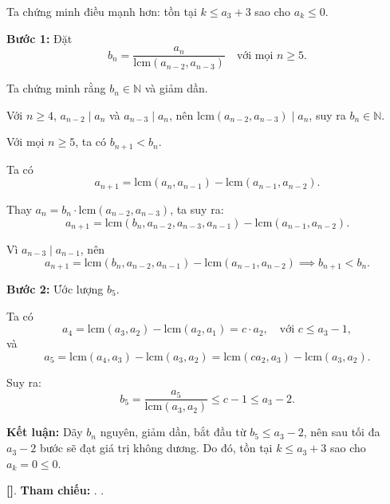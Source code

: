 \documentclass[../2015-n-s.tex]{subfiles}
\begin{document}
\begin{soln}

	Ta chứng minh điều mạnh hơn: tồn tại \( k \leq a_3 + 3 \) sao cho \( a_k \leq 0 \).

	\textbf{Bước 1:} Đặt
	\[
		b_n = \frac{a_n}{\text{lcm}(a_{n-2}, a_{n-3})} \quad \text{với mọi } n \geq 5.
	\]
	
	Ta chứng minh rằng \( b_n \in \mathbb{N} \) và giảm dần.

	Với \( n \geq 4 \), \( a_{n-2} \mid a_n \) và \( a_{n-3} \mid a_n \), nên \( \text{lcm}(a_{n-2}, a_{n-3}) \mid a_n \), suy ra \( b_n \in \mathbb{N} \).

	\begin{claim*}
		Với mọi \( n \geq 5 \), ta có \( b_{n+1} < b_n \).
	\end{claim*}
	\begin{subproof}
		Ta có
		\[
			a_{n+1} = \text{lcm}(a_n, a_{n-1}) - \text{lcm}(a_{n-1}, a_{n-2}).
		\]
		
		Thay \( a_n = b_n \cdot \text{lcm}(a_{n-2}, a_{n-3}) \), ta suy ra:
		\[
			a_{n+1} = \text{lcm}(b_n, a_{n-2}, a_{n-3}, a_{n-1}) - \text{lcm}(a_{n-1}, a_{n-2}).
		\]
		
		Vì \( a_{n-3} \mid a_{n-1} \), nên
		\[
			a_{n+1} = \text{lcm}(b_n, a_{n-2}, a_{n-1}) - \text{lcm}(a_{n-1}, a_{n-2}) \implies b_{n+1} < b_n.
		\]
	\end{subproof}

	\textbf{Bước 2:} Ước lượng \( b_5 \).

	Ta có
	\[
		a_4 = \text{lcm}(a_3, a_2) - \text{lcm}(a_2, a_1) = c \cdot a_2,\quad \text{với } c \leq a_3 - 1,
	\]
	và
	\[
		a_5 = \text{lcm}(a_4, a_3) - \text{lcm}(a_3, a_2) = \text{lcm}(c a_2, a_3) - \text{lcm}(a_3, a_2).
	\]
	
	Suy ra:
	\[
		b_5 = \frac{a_5}{\text{lcm}(a_3, a_2)} \leq c - 1 \leq a_3 - 2.
	\]

	\textbf{Kết luận:} Dãy \( b_n \) nguyên, giảm dần, bắt đầu từ \( b_5 \leq a_3 - 2 \), nên sau tối đa \( a_3 - 2 \) bước sẽ đạt giá trị không dương.
	Do đó, tồn tại \( k \leq a_3 + 3 \) sao cho \( a_k = 0 \leq 0 \).

	\vspace{1em}
	\textbf{[]}.
	\textbf{Tham chiếu:} . .
\end{soln}

\end{document}
